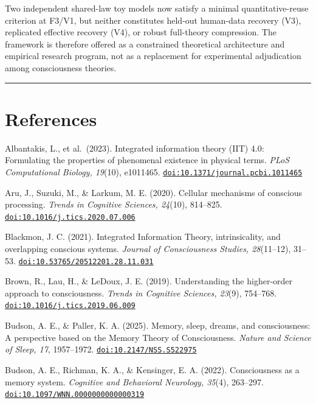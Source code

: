 \documentclass[
  11pt,
  a4paper,
]{article}
\begin{document}
Two independent shared-law toy models now satisfy a minimal
quantitative-reuse criterion at F3/V1, but neither constitutes held-out
human-data recovery (V3), replicated effective recovery (V4), or robust
full-theory compression. The framework is therefore offered as a
constrained theoretical architecture and empirical research program, not
as a replacement for experimental adjudication among consciousness
theories.

\begin{center}\rule{0.5\linewidth}{0.5pt}\end{center}

\hypertarget{references}{%
\section{References}\label{references}}

Albantakis, L., et al.~(2023). Integrated information theory (IIT) 4.0:
Formulating the properties of phenomenal existence in physical terms.
\emph{PLoS Computational Biology, 19}(10), e1011465.
\href{https://doi.org/10.1371/journal.pcbi.1011465}{\nolinkurl{doi:10.1371/journal.pcbi.1011465}}

Aru, J., Suzuki, M., \& Larkum, M. E. (2020). Cellular mechanisms of
conscious processing. \emph{Trends in Cognitive Sciences, 24}(10),
814--825.
\href{https://doi.org/10.1016/j.tics.2020.07.006}{\nolinkurl{doi:10.1016/j.tics.2020.07.006}}

Blackmon, J. C. (2021). Integrated Information Theory, intrinsicality,
and overlapping conscious systems. \emph{Journal of Consciousness
Studies, 28}(11--12), 31--53.
\href{https://doi.org/10.53765/20512201.28.11.031}{\nolinkurl{doi:10.53765/20512201.28.11.031}}

Brown, R., Lau, H., \& LeDoux, J. E. (2019). Understanding the
higher-order approach to consciousness. \emph{Trends in Cognitive
Sciences, 23}(9), 754--768.
\href{https://doi.org/10.1016/j.tics.2019.06.009}{\nolinkurl{doi:10.1016/j.tics.2019.06.009}}

Budson, A. E., \& Paller, K. A. (2025). Memory, sleep, dreams, and
consciousness: A perspective based on the Memory Theory of
Consciousness. \emph{Nature and Science of Sleep, 17}, 1957--1972.
\href{https://doi.org/10.2147/NSS.S522975}{\nolinkurl{doi:10.2147/NSS.S522975}}

Budson, A. E., Richman, K. A., \& Kensinger, E. A. (2022). Consciousness
as a memory system. \emph{Cognitive and Behavioral Neurology, 35}(4),
263--297.
\href{https://doi.org/10.1097/WNN.0000000000000319}{\nolinkurl{doi:10.1097/WNN.0000000000000319}}
\end{document}
